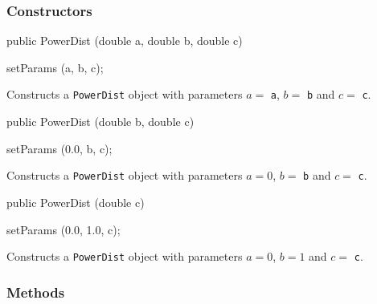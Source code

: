 \subsubsection* {Constructors}

\begin{code}

   public PowerDist (double a, double b, double c)\begin{hide} {
      setParams (a, b, c);
   }\end{hide}
\end{code}
\begin{tabb} Constructs a \texttt{PowerDist} object with parameters 
     $a =$ \texttt{a}, $b =$ \texttt{b} and $c =$ \texttt{c}.
 \end{tabb}
\begin{code}

   public PowerDist (double b, double c)\begin{hide} {
      setParams (0.0, b, c);
   }\end{hide}
\end{code}
\begin{tabb} Constructs a \texttt{PowerDist} object with parameters 
     $a = 0$, $b =$ \texttt{b} and $c =$ \texttt{c}.
 \end{tabb}
\begin{code}

   public PowerDist (double c)\begin{hide} {
      setParams (0.0, 1.0, c);
   }\end{hide}
\end{code}
\begin{tabb} Constructs a \texttt{PowerDist} object with parameters 
     $a = 0$, $b =1$ and $c =$ \texttt{c}.
 \end{tabb}


\subsubsection* {Methods}


